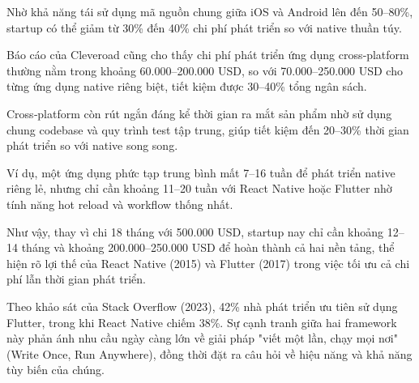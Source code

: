       \begin{flushleft}
        \hspace*{0.8cm}Nhờ khả năng tái sử dụng mã nguồn chung giữa iOS và Android lên đến 50–80\%, startup có thể giảm từ 30\% đến 40\% chi phí phát triển so với native thuần túy.
      \end{flushleft}

      \begin{flushleft}
        \hspace*{0.8cm}Báo cáo của Cleveroad cũng cho thấy chi phí phát triển ứng dụng cross‑platform thường nằm trong khoảng 60.000–200.000 USD, so với 70.000–250.000 USD cho từng ứng dụng native riêng biệt, tiết kiệm được 30–40\% tổng ngân sách. 
      \end{flushleft}

      \begin{flushleft}
        \hspace*{0.8cm}Cross‑platform còn rút ngắn đáng kể thời gian ra mắt sản phẩm nhờ sử dụng chung codebase và quy trình test tập trung, giúp tiết kiệm đến 20–30\% thời gian phát triển so với native song song.
      \end{flushleft}

      \begin{flushleft}
        \hspace*{0.8cm}Ví dụ, một ứng dụng phức tạp trung bình mất 7–16 tuần để phát triển native riêng lẻ, nhưng chỉ cần khoảng 11–20 tuần với React Native hoặc Flutter nhờ tính năng hot reload và workflow thống nhất.
      \end{flushleft}

      \begin{flushleft}
        \hspace*{0.8cm}Như vậy, thay vì chi 18 tháng với 500.000 USD, startup nay chỉ cần khoảng 12–14 tháng và khoảng 200.000–250.000 USD để hoàn thành cả hai nền tảng, thể hiện rõ lợi thế của React Native (2015) và Flutter (2017) trong việc tối ưu cả chi phí lẫn thời gian phát triển.
      \end{flushleft}

      \begin{flushleft}
        \hspace*{0.8cm}Theo khảo sát của Stack Overflow (2023), 42\% nhà phát triển ưu tiên sử dụng Flutter, trong khi React Native chiếm 38\%. Sự cạnh tranh giữa hai framework này phản ánh nhu cầu ngày càng lớn về giải pháp "viết một lần, chạy mọi nơi" (Write Once, Run Anywhere), đồng thời đặt ra câu hỏi về hiệu năng và khả năng tùy biến của chúng.
      \end{flushleft}

